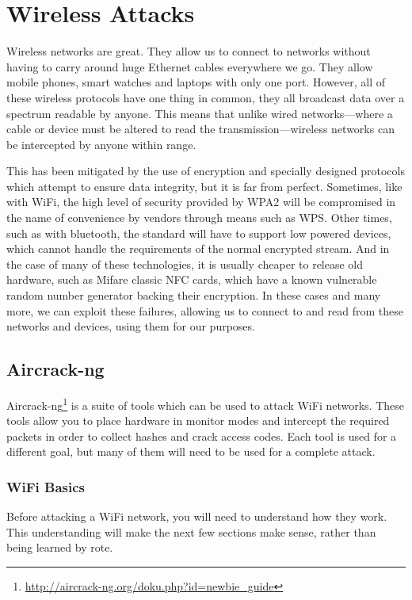 \chapter{Wireless Attacks}
	\label{ch:WirelessAttacks}
	Wireless networks are great. 
	They allow us to connect to networks without having to carry around huge Ethernet cables everywhere we go. 
	They allow mobile phones, smart watches and laptops with only one port. 
	However, all of these wireless protocols have one thing in common, they all broadcast data over a spectrum readable by anyone. 
	This means that unlike wired networks---where a cable or device must be altered to read the transmission---wireless networks can be intercepted by anyone within range. 
	
	This has been mitigated by the use of encryption and specially designed protocols which attempt to ensure data integrity, but it is far from perfect. 
	Sometimes, like with WiFi, the high level of security provided by WPA2 will be compromised in the name of convenience by vendors through means such as WPS.
	Other times, such as with bluetooth, the standard will have to support low powered devices, which cannot handle the requirements of the normal encrypted stream. 
	And in the case of many of these technologies, it is usually cheaper to release old hardware, such as Mifare classic NFC cards, which have a known vulnerable random number generator backing their encryption. 
	In these cases and many more, we can exploit these failures, allowing us to connect to and read from these networks and devices, using them for our purposes. 
	\section{Aircrack-ng}
		Aircrack-ng\footnote{\url{http://aircrack-ng.org/doku.php?id=newbie\_guide}} is a suite of tools which can be used to attack WiFi networks. 
		These tools allow you to place hardware in monitor modes and intercept the required packets in order to collect hashes and crack access codes. 
		Each tool is used for a different goal, but many of them will need to be used for a complete attack. 
		\subsection{WiFi Basics}
			Before attacking a WiFi network, you will need to understand how they work. 
			This understanding will make the next few sections make sense, rather than being learned by rote.

